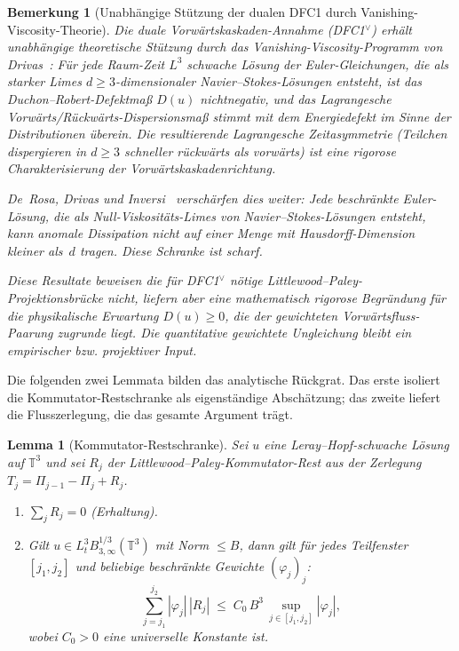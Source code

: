 \documentclass[12pt,a4paper]{article}
\theoremstyle{breakdef}
\theoremstyle{breakplain}
\newtheorem{lemma}[definition]{Lemma}
\theoremstyle{breakdef}
\newtheorem{remark}[definition]{Bemerkung}
\begin{document}
\begin{remark}[Unabhängige Stützung der dualen DFC1 durch Vanishing-Viscosity-Theorie]
\label{rem:Drivas-VV}
Die duale Vorwärtskaskaden-Annahme (DFC1$^\vee$) erhält unabhängige theoretische
Stützung durch das Vanishing-Viscosity-Programm von
Drivas~\cite{Drivas2019cascade}:
Für jede Raum-Zeit $L^3$ schwache Lösung der Euler-Gleichungen, die als
starker Limes $d\ge 3$-dimensionaler Navier--Stokes-Lösungen entsteht, ist
das Duchon--Robert-Defektmaß $D(u)$ nichtnegativ, und das Lagrangesche
Vorwärts/Rückwärts-Dispersionsmaß stimmt mit dem Energiedefekt im Sinne
der Distributionen überein. Die resultierende Lagrangesche Zeitasymmetrie
(Teilchen dispergieren in $d\ge 3$ schneller rückwärts als vorwärts) ist
eine rigorose Charakterisierung der Vorwärtskaskadenrichtung.

De~Rosa, Drivas und Inversi~\cite{DeRosaDrivasInversi2024} verschärfen dies
weiter: Jede beschränkte Euler-Lösung, die als Null-Viskositäts-Limes von
Navier--Stokes-Lösungen entsteht, kann anomale Dissipation nicht auf einer
Menge mit Hausdorff-Dimension kleiner als~$d$ tragen. Diese Schranke ist scharf.

Diese Resultate beweisen die für DFC1$^\vee$ nötige
Littlewood--Paley-Projektionsbrücke \emph{nicht}, liefern aber eine
mathematisch rigorose Begründung für die physikalische Erwartung
$D(u) \ge 0$, die der gewichteten Vorwärtsfluss-Paarung zugrunde liegt.
Die quantitative gewichtete Ungleichung bleibt ein empirischer bzw.
projektiver Input.
\end{remark}

Die folgenden zwei Lemmata bilden das analytische Rückgrat. Das erste
isoliert die Kommutator-Restschranke als eigenständige Abschätzung; das
zweite liefert die Flusszerlegung, die das gesamte Argument trägt.

\begin{lemma}[Kommutator-Restschranke]\label{lem:remainder}
Sei $u$ eine Leray--Hopf-schwache Lösung auf $\mathbb{T}^3$ und sei $R_j$
der Littlewood--Paley-Kommutator-Rest aus der Zerlegung
$T_j = \Pi_{j-1} - \Pi_j + R_j$.
\begin{enumerate}
  \item[\textup{(i)}] $\sum_j R_j = 0$ (Erhaltung).
  \item[\textup{(ii)}] Gilt $u \in L^3_t B^{1/3}_{3,\infty}(\mathbb{T}^3)$
    mit Norm $\le B$, dann gilt für jedes Teilfenster $[j_1, j_2]$ und
    beliebige beschränkte Gewichte $(\varphi_j)_j$:
    \begin{equation}\label{eq:Rj-bound}
      \sum_{j=j_1}^{j_2} |\varphi_j|\,|R_j|
      \;\le\;
      C_0\,B^3\,\sup_{j \in [j_1,j_2]} |\varphi_j|,
    \end{equation}
    wobei $C_0 > 0$ eine universelle Konstante ist.
\end{enumerate}
\end{lemma}
\end{document}
